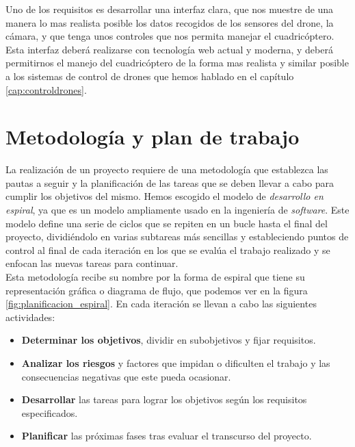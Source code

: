 Uno de los requisitos es desarrollar una interfaz clara, que nos muestre de una manera lo mas realista posible los datos recogidos de los sensores del drone, la cámara, y que tenga unos controles que nos permita manejar el cuadricóptero.\\

Esta interfaz deberá realizarse con tecnología web actual y moderna, y deberá permitirnos el manejo del cuadricóptero de la forma mas realista y similar posible a los sistemas de control de drones que hemos hablado en el capítulo \ref{cap:controldrones}.\\

\section{Metodología y plan de trabajo}

La realización de un proyecto requiere de una metodología que establezca las pautas a seguir y la planificación de las tareas que se deben llevar a cabo para cumplir los objetivos del mismo. Hemos escogido el modelo de \emph{desarrollo en espiral}, ya que es un modelo ampliamente usado en la ingeniería de \emph{software}. Este modelo define una serie de ciclos que se repiten en un bucle hasta el final del proyecto, dividiéndolo en varias subtareas más sencillas y estableciendo puntos de control al final de cada iteración en los que se evalúa el trabajo realizado y se enfocan las nuevas tareas para continuar.\\

Esta metodología recibe su nombre por la forma de espiral que tiene su representación gráfica o diagrama de flujo, que podemos ver en la figura \ref{fig:planificacion_espiral}. En cada iteración se llevan a cabo las siguientes actividades:

\begin{itemize}
 \item \textbf{Determinar los objetivos}, dividir en subobjetivos y fijar requisitos.
 \item \textbf{Analizar los riesgos} y factores que impidan o dificulten el trabajo y las consecuencias negativas que este
 pueda ocasionar.
 \item \textbf{Desarrollar} las tareas para lograr los objetivos según los requisitos especificados.
 \item \textbf{Planificar} las próximas fases tras evaluar el transcurso del proyecto.
\end{itemize}

